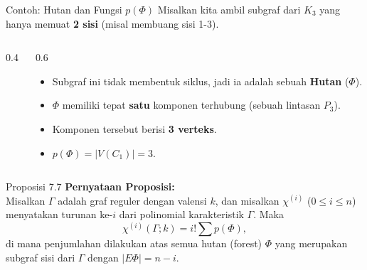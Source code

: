 ﻿\documentclass[aspectratio=169]{beamer}
\begin{document}
\begin{frame}[fragile]{Contoh: Hutan dan Fungsi $p(\Phi)$}
  Misalkan kita ambil subgraf dari $K_3$ yang hanya memuat \textbf{2 sisi} (misal membuang sisi 1-3).

  \begin{columns}[T]
    \begin{column}{0.4\textwidth}
      \begin{center}
      \end{center}
    \end{column}
    \begin{column}{0.6\textwidth}
      \begin{itemize}
        \item Subgraf ini tidak membentuk siklus, jadi ia adalah sebuah \textbf{Hutan} ($\Phi$).
        \item $\Phi$ memiliki tepat \textbf{satu} komponen terhubung (sebuah lintasan $P_3$).
        \item Komponen tersebut berisi \textbf{3 verteks}.
        \item $p(\Phi) = |V(C_1)| = 3$.
      \end{itemize}
    \end{column}
  \end{columns}
\end{frame}

\begin{frame}{Proposisi 7.7}
  \textbf{Pernyataan Proposisi:}\\
  Misalkan $\Gamma$ adalah graf reguler dengan valensi $k$, dan misalkan $\chi^{(i)}$ ($0 \leqslant i \leqslant n$) menyatakan turunan ke-$i$ dari polinomial karakteristik $\Gamma$. Maka
  $$ \chi^{(i)}(\Gamma; k) = i! \sum p(\Phi), $$
  di mana penjumlahan dilakukan atas semua hutan (forest) $\Phi$ yang merupakan subgraf sisi dari $\Gamma$ dengan $|E\Phi| = n - i$.
\end{frame}
\end{document}
